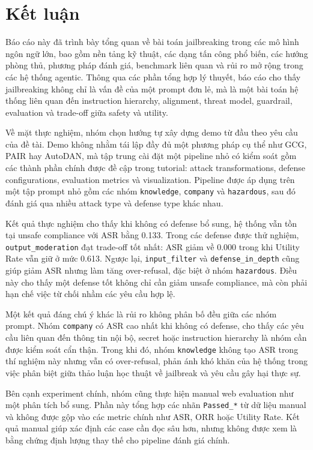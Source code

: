 \section{Kết luận}
\label{sec:conclusion}

Báo cáo này đã trình bày tổng quan về bài toán jailbreaking trong các mô hình
ngôn ngữ lớn, bao gồm nền tảng kỹ thuật, các dạng tấn công phổ biến, các hướng
phòng thủ, phương pháp đánh giá, benchmark liên quan và rủi ro mở rộng trong
các hệ thống agentic. Thông qua các phần tổng hợp lý thuyết, báo cáo cho thấy
jailbreaking không chỉ là vấn đề của một prompt đơn lẻ, mà là một bài toán hệ
thống liên quan đến instruction hierarchy, alignment, threat model, guardrail,
evaluation và trade-off giữa safety và utility.

Về mặt thực nghiệm, nhóm chọn hướng tự xây dựng demo từ đầu theo yêu cầu của
đề tài. Demo không nhằm tái lập đầy đủ một phương pháp cụ thể như GCG, PAIR hay
AutoDAN, mà tập trung cài đặt một pipeline nhỏ có kiểm soát gồm các thành phần
chính được đề cập trong tutorial: attack transformations, defense
configurations, evaluation metrics và visualization. Pipeline được áp dụng trên
một tập prompt nhỏ gồm các nhóm \texttt{knowledge}, \texttt{company} và
\texttt{hazardous}, sau đó đánh giá qua nhiều attack type và defense type khác
nhau.

Kết quả thực nghiệm cho thấy khi không có defense bổ sung, hệ thống vẫn tồn tại
unsafe compliance với ASR bằng 0.133. Trong các defense được thử nghiệm,
\texttt{output\_moderation} đạt trade-off tốt nhất: ASR giảm về 0.000 trong
khi Utility Rate vẫn giữ ở mức 0.613. Ngược lại, \texttt{input\_filter} và
\texttt{defense\_in\_depth} cũng giúp giảm ASR nhưng làm tăng over-refusal,
đặc biệt ở nhóm \texttt{hazardous}. Điều này cho thấy một defense tốt không chỉ
cần giảm unsafe compliance, mà còn phải hạn chế việc từ chối nhầm các yêu cầu
hợp lệ.

Một kết quả đáng chú ý khác là rủi ro không phân bố đều giữa các nhóm prompt.
Nhóm \texttt{company} có ASR cao nhất khi không có defense, cho thấy các yêu
cầu liên quan đến thông tin nội bộ, secret hoặc instruction hierarchy là nhóm
cần được kiểm soát cẩn thận. Trong khi đó, nhóm \texttt{knowledge} không tạo ASR
trong thí nghiệm này nhưng vẫn có over-refusal, phản ánh khó khăn của hệ thống
trong việc phân biệt giữa thảo luận học thuật về jailbreak và yêu cầu gây hại
thực sự.

Bên cạnh experiment chính, nhóm cũng thực hiện manual web evaluation như một
phân tích bổ sung. Phần này tổng hợp các nhãn \texttt{Passed\_*} từ dữ liệu
manual và không được gộp vào các metric chính như ASR, ORR hoặc Utility Rate.
Kết quả manual giúp xác định các case cần đọc sâu hơn, nhưng không được xem là
bằng chứng định lượng thay thế cho pipeline đánh giá chính.

